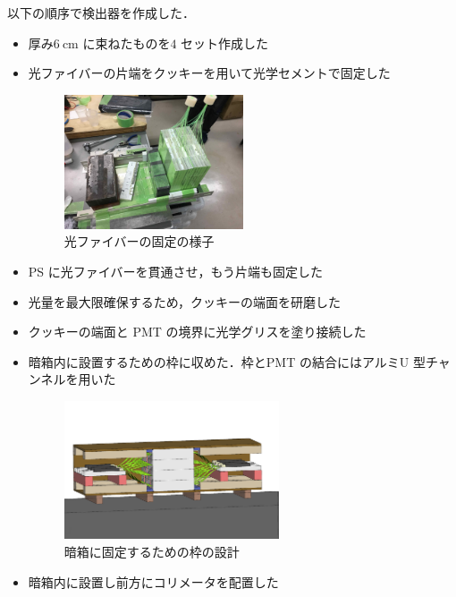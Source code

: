 以下の順序で検出器を作成した．
\begin{itemize}
\item 厚み$6~\mathrm{cm}$ に束ねたものを$4$ セット作成した
\item 光ファイバーの片端をクッキーを用いて光学セメントで固定した
\begin{figure}[H]
\centering
\includegraphics[width=0.5\textwidth]{figure/hayakawa/ps_kotei.jpg}
\caption{光ファイバーの固定の様子}
\end{figure}
\item PS に光ファイバーを貫通させ，もう片端も固定した
\item 光量を最大限確保するため，クッキーの端面を研磨した
\item クッキーの端面と PMT の境界に光学グリスを塗り接続した
\item 暗箱内に設置するための枠に収めた．枠とPMT の結合にはアルミU 型チャンネルを用いた
\begin{figure}[H]
\centering
\includegraphics[width=0.6\textwidth]{figure/hayakawa/waku1.png}
\caption{暗箱に固定するための枠の設計}
\end{figure}
\item 暗箱内に設置し前方にコリメータを配置した
\end{itemize}

